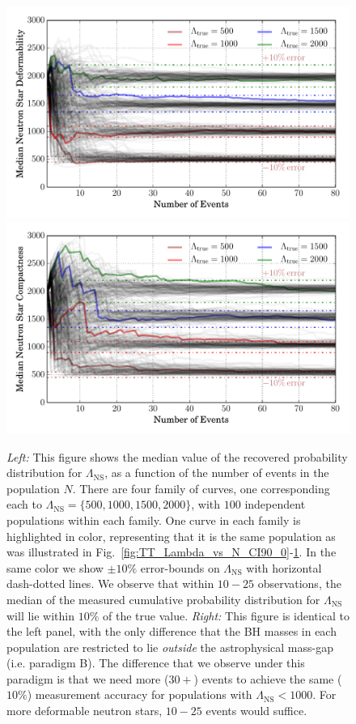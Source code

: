\documentclass[aps,prd,amsmath,floats,floatfix, twocolumn,
superscriptaddress,nofootinbib,showpacs]{revtex4-1}
\newcommand{\lambdans}{\Lambda_\mathrm{NS}}
\begin{document}
% 
\begin{figure}
\centering
\includegraphics[trim=20 0 0 0, width=1.02\columnwidth]{plots/LambdaMedian_vs_N_AllPopulation}
\includegraphics[trim=20 0 0 0, width=1.02\columnwidth]{plots/LambdaMedian_vs_N_AstroPopulation}
\caption{%
{\it Left:} This figure shows the median value of the recovered
probability distribution for $\lambdans$, as a function of the number of events
in the population $N$. There are four family of curves, one corresponding each
to $\lambdans=\{500,1000,1500,2000\}$, with $100$ independent populations
within each family. One curve in each family is highlighted in color, 
representing that it is the same population as was illustrated in
Fig.~\ref{fig:TT_Lambda_vs_N_CI90_0}-\ref{fig:TT_LambdaMedian_vs_N_AllInOne}.
In the same color we show $\pm 10\%$ error-bounds on $\lambdans$ with
horizontal dash-dotted lines. We observe that within $10-25$ observations, 
the median of the measured cumulative probability distribution for $\lambdans$
will lie within $10\%$ of the true value.
{\it Right:} This figure is identical to the left panel, with the only
difference that the BH masses in each population are restricted to lie
{\it outside} the astrophysical mass-gap (i.e. paradigm B). The difference that
we observe under this paradigm is that we need more ($30+$) events to achieve 
the same ($10\%$) measurement accuracy for populations with $\lambdans<1000$.
For more deformable neutron stars, $10-25$ events would suffice.
}
\label{fig:TT_LambdaMedian_vs_N_AllInOne}
\end{figure}
\end{document}
